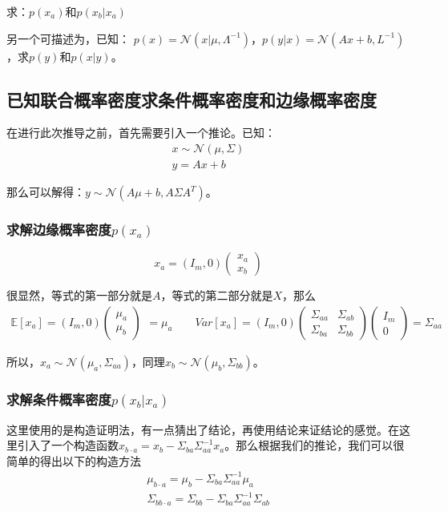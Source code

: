 \documentclass[a4paper]{article}
\numberwithin{equation}{section}
\begin{document}
求：$p(x_a)$和$p(x_b|x_a)$

另一个可描述为，已知：
$p(x)=\mathcal{N}(x|\mu,\Lambda^{-1})$，$p(y|x)=\mathcal{N}(Ax+b,L^{-1})$，求$p(y)$和$p(x|y)$。

\subsection{已知联合概率密度求条件概率密度和边缘概率密度}
在进行此次推导之前，首先需要引入一个推论。已知：
\begin{gather}
    x\sim \mathcal{N}(\mu,\Sigma) \\
    y = Ax + b
\end{gather}

那么可以解得：$y\sim \mathcal{N}(A\mu+b, A\Sigma A^T)$。
\subsubsection{求解边缘概率密度$p(x_a)$}
\begin{equation}
    x_a = (I_m,0)
    \begin{pmatrix}
        x_a \\
        x_b
    \end{pmatrix}
\end{equation}

很显然，等式的第一部分就是$A$，等式的第二部分就是$X$，那么
\begin{equation}
    \begin{split}
        \mathbb{E}[x_a]=(I_m,0)
    \begin{pmatrix}
        \mu_a \\
        \mu_b
    \end{pmatrix}
    \end{split}=\mu_a \qquad
    Var[x_a] = (I_m,0)
    \begin{pmatrix}
    \Sigma_{aa} & \Sigma_{ab} \\
    \Sigma_{ba} & \Sigma_{bb} 
    \end{pmatrix}
    \begin{pmatrix}
    I_m \\
    0  
    \end{pmatrix}=\Sigma_{aa}
\end{equation}

所以，$x_a\sim \mathcal{N}(\mu_a, \Sigma_{aa})$，同理$x_b \sim \mathcal{N}(\mu_b,\Sigma_{bb})$。

\subsubsection{求解条件概率密度$p(x_b|x_a)$}
这里使用的是构造证明法，有一点猜出了结论，再使用结论来证结论的感觉。在这里引入了一个构造函数$x_{b\cdot a}=x_b-\Sigma_{ba}\Sigma_{aa}^{-1}x_a$。那么根据我们的推论，我们可以很简单的得出以下的构造方法
\begin{gather}
    \mu_{b\cdot a}= \mu_b-\Sigma_{ba}\Sigma_{aa}^{-1}\mu_a \\
    \Sigma_{bb \cdot a} = \Sigma_{bb}-\Sigma_{ba}\Sigma_{aa}^{-1}\Sigma_{ab} 
\end{gather}
\end{document}
